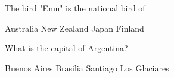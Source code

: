 \begin{questions}
    \question The bird "Emu" is the national bird of \fillin

    \begin{randomizeoneparchoices}
        \CorrectChoice Australia
        \choice New Zealand
        \choice Japan
        \choice Finland
    \end{randomizeoneparchoices}

    \question What is the capital of Argentina?

    \begin{randomizeoneparchoices}
        \CorrectChoice Buenos Aires
        \choice Brasilia
        \choice Santiago
        \choice Los Glaciares
    \end{randomizeoneparchoices}


\end{questions}

